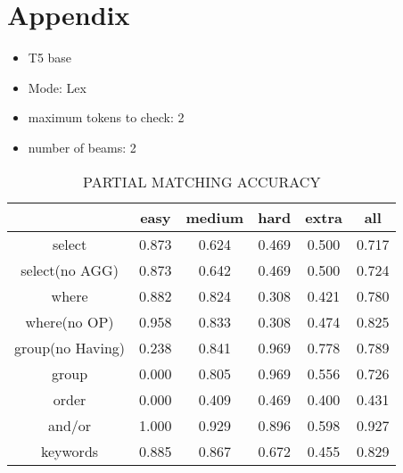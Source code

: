 \section{Appendix}
\label{sec:appendix}

\begin{itemize}
    \item T5 base
    \item Mode: Lex
    \item maximum tokens to check: 2
    \item number of beams: 2
\end{itemize}
\begin{table}[h!]
    \centering
    \begin{tabular}{|c|c|c|c|c|c|}
        \hline
                         & easy  & medium & hard  & extra & all   \\ \hline
        select           & 0.873 & 0.624  & 0.469 & 0.500 & 0.717 \\ \hline
        select(no AGG)   & 0.873 & 0.642  & 0.469 & 0.500 & 0.724 \\ \hline
        where            & 0.882 & 0.824  & 0.308 & 0.421 & 0.780 \\ \hline
        where(no OP)     & 0.958 & 0.833  & 0.308 & 0.474 & 0.825 \\ \hline
        group(no Having) & 0.238 & 0.841  & 0.969 & 0.778 & 0.789 \\ \hline
        group            & 0.000 & 0.805  & 0.969 & 0.556 & 0.726 \\ \hline
        order            & 0.000 & 0.409  & 0.469 & 0.400 & 0.431 \\ \hline
        and/or           & 1.000 & 0.929  & 0.896 & 0.598 & 0.927 \\ \hline

        keywords         & 0.885 & 0.867  & 0.672 & 0.455 & 0.829 \\ \hline
    \end{tabular}
    \caption{PARTIAL MATCHING ACCURACY}
\end{table}

